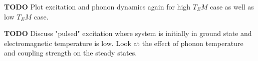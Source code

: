 \documentclass[]{article}
\begin{document}
\textbf{TODO}
Plot excitation and phonon dynamics again for high $T_EM$ case as well as low $T_EM$ case.

\textbf{TODO}
Discuss "pulsed" excitation where system is initially in ground state and electromagnetic temperature is low. Look at the effect of phonon temperature and coupling strength on the steady states.

\begin{comment}
\begin{figure}[h]
	\centering
	\texttt{[image: "/Users/henrymaguire/Work/phd-work/vibronic-TLS/Notes/Images/Checks/Pop\_SS\_divergence\_a300\_Tem6000\_w0300\_eps2000".pdf]}
	\caption{Steady-state excited state population as a function of TLS splitting where $\alpha_{ph}=300$, $T_{EM} =6000$, $\omega_0 = 300$}
	\label{fig:steadyStatevsSplitting}
\end{figure}


\subsection{Underdamped Lorentzian Spectral Density (Localised vibrations)}
\begin{itemize}
	\item Large splitting, everything converges.
	\item As splitting decreases, the NS and S start to diverge from the naive. NS and S remain close until very small splitting, at which point the NS appears to return towards agreement with naive.
\end{itemize}

For moderate splitting and an underdamped phonon spectral density, the excited and ground states vibronic manifolds are well separated, see figures \ref{fig:manifold_weakcoupling}-\ref{fig:manifold_strongsmallsplitting}. This means that the dynamics are well approximated by the naive, electronic Lindblad theory of dissipation. However, if the electronic splitting becomes sufficiently small then the two manifolds can overlap and we start to observe the complex behaviour seen in the overdamped case. This happens at a much smaller splitting size since the ladder spacing of the vibronic states is so much smaller.

\begin{itemize}
	\item Is this occurring because the system is so far off resonance with the vibrations? (Reducing the splitting so it is closer to the peak of the spectral density indeed means vibronic theories diverge from the naive.)
\end{itemize}


\end{comment}
\end{document}
